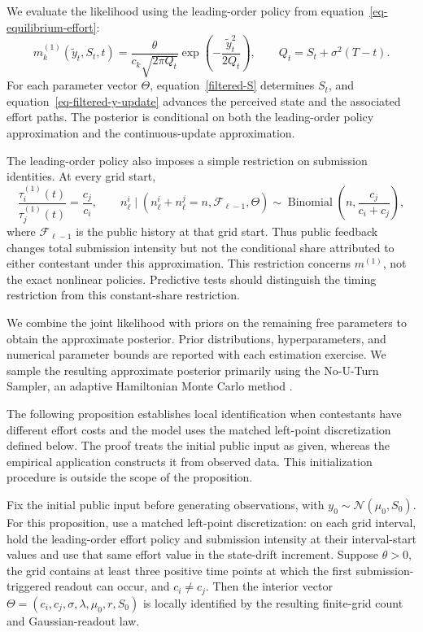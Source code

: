 \documentclass[mnsc]{informs3}
\begin{document}
{We evaluate the likelihood using the leading-order policy from equation~\eqref{eq-equilibrium-effort}:}
\begin{equation}\label{eq-empirical-leading-effort}
{m_k^{(1)}(\tilde y_t,S_t,t)
=\frac{\theta}{c_k\sqrt{2\pi Q_t}}
\exp\!\left(-\frac{\tilde y_t^2}{2Q_t}\right),
\qquad Q_t=S_t+\sigma^2(T-t).}
\end{equation}
{For each parameter vector $\Theta$, equation~\eqref{filtered-S} determines $S_t$, and equation~\eqref{eq-filtered-y-update} advances the perceived state and the associated effort paths. The posterior is conditional on both the leading-order policy approximation and the continuous-update approximation.}

\begingroup
The leading-order policy also imposes a simple restriction on submission identities. At every grid start,
\[
\frac{\tau_i^{(1)}(t)}{\tau_j^{(1)}(t)}=\frac{c_j}{c_i},
\qquad
n_\ell^i\mid(n_\ell^i+n_\ell^j=n,\mathcal F_{\ell-1},\Theta)
\sim\operatorname{Binomial}\!\left(n,\frac{c_j}{c_i+c_j}\right),
\]
where $\mathcal F_{\ell-1}$ is the public history at that grid start.
Thus public feedback changes total submission intensity but not the conditional share attributed to either contestant under this approximation. This restriction concerns $m^{(1)}$, not the exact nonlinear policies. Predictive tests should distinguish the timing restriction from this constant-share restriction.
\par\endgroup

We combine the joint likelihood with priors on the remaining free parameters to obtain the approximate posterior. Prior distributions, hyperparameters, and numerical parameter bounds are reported with each estimation exercise.
We sample the resulting approximate posterior primarily using the No-U-Turn Sampler, an adaptive Hamiltonian Monte Carlo method \citep{hoffman2014NUTS}.

{\color{black}The following proposition establishes local identification when contestants have different effort costs and the model uses the matched left-point discretization defined below. The proof treats the initial public input as given, whereas the empirical application constructs it from observed data. This initialization procedure is outside the scope of the proposition.}

\begin{proposition}\label{prop-local-identification}
{Fix the initial public input before generating observations, with $y_0\sim\mathcal N(\mu_0,S_0)$. For this proposition, use a matched left-point discretization: on each grid interval, hold the leading-order effort policy and submission intensity at their interval-start values and use that same effort value in the state-drift increment. Suppose $\theta>0$, {\color{black}the grid contains at least three positive time points at which the first submission-triggered readout can occur}, and $c_i\ne c_j$. Then the interior vector $\Theta=(c_i,c_j,\sigma,\lambda,\mu_0,r,S_0)$ is {\color{black}locally identified} by the resulting finite-grid count and Gaussian-readout law.}
\end{proposition}
\end{document}
